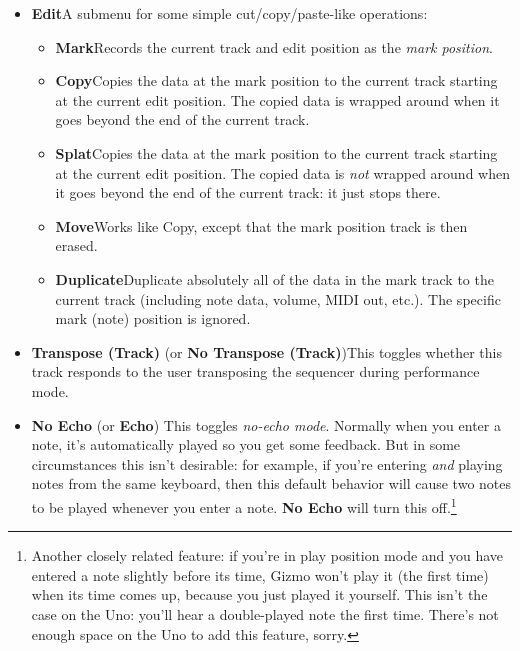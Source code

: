 \documentclass{article}
\begin{document}
\begin{itemize}
\item {\bf Edit}\quad A submenu for some simple cut/copy/paste-like operations:
\begin{itemize}
\item {\bf Mark}\quad Records the current track and edit position as the {\it mark position}.
\item {\bf Copy}\quad Copies the data at the mark position to the current track starting at the current edit position.  The copied data is wrapped around when it goes beyond the end of the current track.
\item {\bf Splat}\quad Copies the data at the mark position to the current track starting at the current edit position.  The copied data is {\it not} wrapped around when it goes beyond the end of the current track: it just stops there.
\item {\bf Move}\quad Works like Copy, except that the mark position track is then erased.
\item {\bf Duplicate}\quad Duplicate absolutely all of the data in the mark track to the current track (including note data, volume, MIDI out, etc.).  The specific mark (note) position is ignored.
\end{itemize}
\item {\bf Transpose (Track)} (or {\bf No Transpose (Track)})\quad This toggles whether this track responds to the user transposing the sequencer during performance mode.
\item {\bf No Echo} (or {\bf Echo}) \quad This toggles {\it no-echo mode}.  Normally when you enter a note, it's automatically played so you get some feedback.  But in some circumstances this isn't desirable: for example, if you're entering {\it and} playing notes from the same keyboard, then this default behavior will cause two notes to be played whenever you enter a note.  {\bf No Echo} will turn this off.\footnote{Another closely related feature: if you're in play position mode and you have entered a note slightly before its time, Gizmo won't play it (the first time) when its time comes up, because you just played it yourself.  This isn't the case on the Uno: you'll hear a double-played note the first time.  There's not enough space on the Uno to add this feature, sorry.}


\end{itemize}
\end{document}
